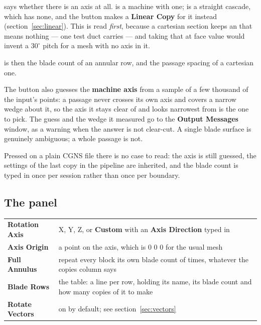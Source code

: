 \documentclass[11pt,a4paper]{article}
\newcommand{\prop}[1]{\textbf{#1}}          %
\newcommand{\menu}[1]{\textbf{#1}}          %
\begin{document}
 says whether there is an axis at all.  is a machine
with one;  is a straight cascade, which has none, and the button
makes a \menu{Linear Copy} for it instead (section~\ref{sec:linear}). This is
read \emph{first}, because a cartesian section keeps an
 that means nothing --- one test duct carries
 --- and taking that at face value would invent a
$30^\circ$ pitch for a mesh with no axis in it.

 is then the blade count of an annular row, and
 the passage spacing of a cartesian one.

The button also guesses the \textbf{machine axis} from a sample of a few
thousand of the input's points: a passage never crosses its own axis and covers
a narrow wedge about it, so the axis it stays clear of and looks narrowest from
is the one to pick. The guess and the wedge it measured go to the \menu{Output
Messages} window, as a warning when the answer is not clear-cut. A single blade
surface is genuinely ambiguous; a whole passage is not.

Pressed on a plain CGNS file there is no case to read: the axis is still
guessed, the settings of the last copy in the pipeline are inherited, and the
blade count is typed in once per session rather than once per boundary.

\subsection{The panel}

\begin{center}
\begin{tabular}{@{}L{34mm}L{92mm}@{}}
\toprule
\prop{Rotation Axis} & X, Y, Z, or \menu{Custom} with an \prop{Axis Direction}
  typed in \\
\prop{Axis Origin} & a point on the axis, which is 0 0 0 for the usual mesh \\
\prop{Full Annulus} & repeat every block its own blade count of times, whatever
  the copies column says \\
\prop{Blade Rows} & the table: a line per row, holding its name, its blade count
  and how many copies of it to make \\
\prop{Rotate Vectors} & on by default; see section~\ref{sec:vectors} \\
\bottomrule
\end{tabular}
\end{center}
\end{document}
